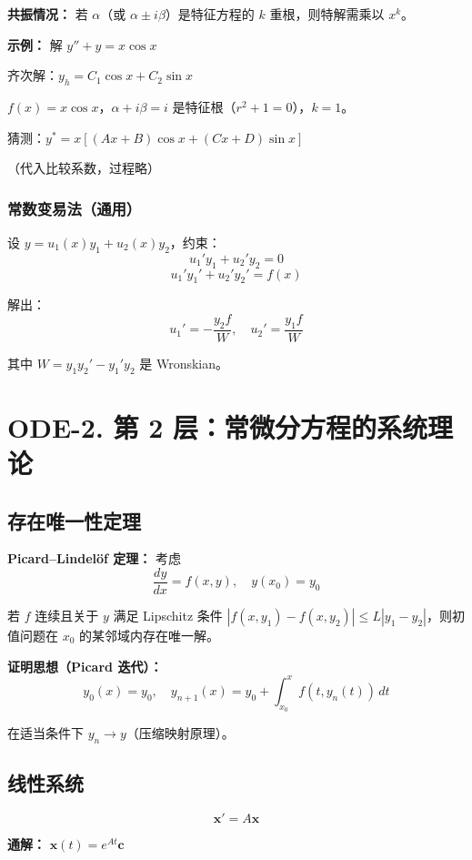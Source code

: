 \textbf{共振情况：} 若 $\alpha$（或 $\alpha \pm i\beta$）是特征方程的 $k$ 重根，则特解需乘以 $x^k$。

\textbf{示例：} 解 $y'' + y = x\cos x$

齐次解：$y_h = C_1\cos x + C_2\sin x$

$f(x) = x\cos x$，$\alpha + i\beta = i$ 是特征根（$r^2 + 1 = 0$），$k = 1$。

猜测：$y^* = x[(Ax + B)\cos x + (Cx + D)\sin x]$

（代入比较系数，过程略）

\subsubsection{常数变易法（通用）}

设 $y = u_1(x)y_1 + u_2(x)y_2$，约束：
\[
u_1' y_1 + u_2' y_2 = 0
\]
\[
u_1' y_1' + u_2' y_2' = f(x)
\]

解出：
\[
u_1' = -\frac{y_2 f}{W}, \quad u_2' = \frac{y_1 f}{W}
\]

其中 $W = y_1 y_2' - y_1' y_2$ 是 Wronskian。

\section{ODE-2. 第 2 层：常微分方程的系统理论}

\subsection{存在唯一性定理}

\textbf{Picard--Lindelöf 定理：} 考虑
\[
\frac{dy}{dx} = f(x, y), \quad y(x_0) = y_0
\]

若 $f$ 连续且关于 $y$ 满足 Lipschitz 条件 $|f(x,y_1) - f(x,y_2)| \leq L|y_1 - y_2|$，则初值问题在 $x_0$ 的某邻域内存在唯一解。

\textbf{证明思想（Picard 迭代）：}
\[
y_0(x) = y_0, \quad y_{n+1}(x) = y_0 + \int_{x_0}^x f(t, y_n(t))\,dt
\]

在适当条件下 $y_n \to y$（压缩映射原理）。

\subsection{线性系统}

\[
\mathbf{x}' = A\mathbf{x}
\]

\textbf{通解：} $\mathbf{x}(t) = e^{At}\mathbf{c}$

